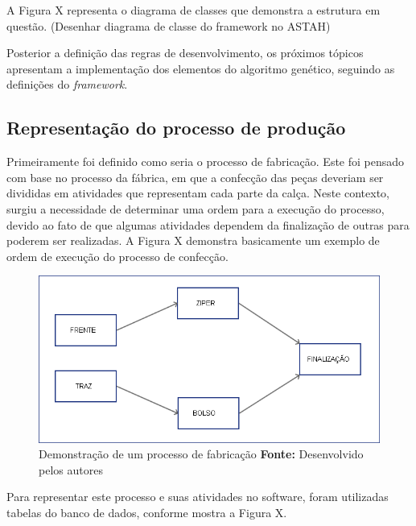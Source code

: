 A Figura X representa o diagrama de classes que demonstra a estrutura em questão.
(Desenhar diagrama de classe do framework no ASTAH)

\par Posterior a definição das regras de desenvolvimento, os próximos tópicos apresentam a implementação 
dos elementos do algoritmo genético, seguindo as definições do \textit{framework}.

\subsection{Representação do processo de produção}

\par Primeiramente foi definido como seria o processo de fabricação. Este foi pensado com base no 
processo da fábrica, em que a confecção das peças deveriam ser divididas em atividades que representam
cada parte da calça. Neste contexto, surgiu a necessidade de determinar uma ordem para a execução do processo, 
devido ao fato de que algumas atividades dependem da finalização de outras para poderem ser
realizadas. A Figura X demonstra basicamente um exemplo de ordem de execução do processo de confecção.

\begin{figure}[h!]
	\centerline{\includegraphics[scale=0.6]{./imagens/processo1.png}}
	\caption[Processo de fabricação]
	{Demonstração de um processo de fabricação \textbf{Fonte:} Desenvolvido pelos autores}
	\label{fig:exemplo1}
\end{figure}

\par Para representar este processo e suas atividades no software, foram utilizadas tabelas do banco de dados, conforme
mostra a Figura X.

